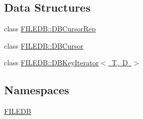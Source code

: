 \subsection*{Data Structures}
\begin{DoxyCompactItemize}
\item 
class \mbox{\hyperlink{classFILEDB_1_1DBCursorRep}{F\+I\+L\+E\+D\+B\+::\+D\+B\+Cursor\+Rep}}
\item 
class \mbox{\hyperlink{classFILEDB_1_1DBCursor}{F\+I\+L\+E\+D\+B\+::\+D\+B\+Cursor}}
\item 
class \mbox{\hyperlink{classFILEDB_1_1DBKeyIterator}{F\+I\+L\+E\+D\+B\+::\+D\+B\+Key\+Iterator$<$ T, D $>$}}
\end{DoxyCompactItemize}
\subsection*{Namespaces}
\begin{DoxyCompactItemize}
\item 
 \mbox{\hyperlink{namespaceFILEDB}{F\+I\+L\+E\+DB}}
\end{DoxyCompactItemize}
